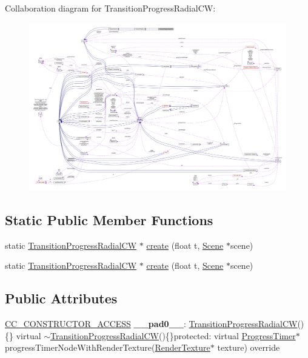 Collaboration diagram for Transition\+Progress\+Radial\+CW\+:
\nopagebreak
\begin{figure}[H]
\begin{center}
\leavevmode
\includegraphics[width=350pt]{classTransitionProgressRadialCW__coll__graph}
\end{center}
\end{figure}
\subsection*{Static Public Member Functions}
\begin{DoxyCompactItemize}
\item 
static \hyperlink{classTransitionProgressRadialCW}{Transition\+Progress\+Radial\+CW} $\ast$ \hyperlink{classTransitionProgressRadialCW_a9a8060b9d6edba1e82d9a2b20993a87e}{create} (float t, \hyperlink{classScene}{Scene} $\ast$scene)
\item 
static \hyperlink{classTransitionProgressRadialCW}{Transition\+Progress\+Radial\+CW} $\ast$ \hyperlink{classTransitionProgressRadialCW_a46e6aae49f5ca257501e11e80fcd7036}{create} (float t, \hyperlink{classScene}{Scene} $\ast$scene)
\end{DoxyCompactItemize}
\subsection*{Public Attributes}
\begin{DoxyCompactItemize}
\item 
\mbox{\label{classTransitionProgressRadialCW_a4703bf6a7fed090530fc2a9950132c60}} 
\hyperlink{_2cocos2d_2cocos_2base_2ccConfig_8h_a25ef1314f97c35a2ed3d029b0ead6da0}{C\+C\+\_\+\+C\+O\+N\+S\+T\+R\+U\+C\+T\+O\+R\+\_\+\+A\+C\+C\+E\+SS} {\bfseries \+\_\+\+\_\+pad0\+\_\+\+\_\+}\+: \hyperlink{classTransitionProgressRadialCW}{Transition\+Progress\+Radial\+CW}()\{\} virtual $\sim$\hyperlink{classTransitionProgressRadialCW}{Transition\+Progress\+Radial\+CW}()\{\}protected\+: virtual \hyperlink{classProgressTimer}{Progress\+Timer}$\ast$ progress\+Timer\+Node\+With\+Render\+Texture(\hyperlink{classRenderTexture}{Render\+Texture}$\ast$ texture) override
\end{DoxyCompactItemize}
